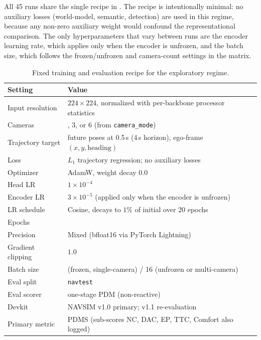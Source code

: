 All 45 runs share the single recipe in . The recipe is intentionally minimal: no auxiliary losses (world-model, semantic, detection) are used in this regime, because any non-zero auxiliary weight would confound the representational comparison. The only hyperparameters that vary between runs are the encoder learning rate, which applies only when the encoder is unfrozen, and the batch size, which follows the frozen/unfrozen and camera-count settings in the matrix.

\begin{table}[ht]
\centering
\caption{Fixed training and evaluation recipe for the exploratory regime.}
\label{tab:meth-lh-recipe}
\small
\renewcommand{\arraystretch}{1.15}
\setlength{\tabcolsep}{6pt}
\begin{tabular}{@{}>{\raggedright\arraybackslash}p{3.8cm} >{\raggedright\arraybackslash}p{8.5cm}@{}}
\toprule
\textbf{Setting} & \textbf{Value} \\
\midrule
Input resolution      & $224 \times 224$, normalized with per-backbone processor statistics \\
Cameras               & 1, 3, or 6 (from \texttt{camera\_mode}) \\
Trajectory target     & 8 future poses at 0.5\,s (4\,s horizon), ego-frame $(x, y, \text{heading})$ \\
Loss                  & $L_1$ trajectory regression; no auxiliary losses \\
Optimizer             & AdamW, weight decay $0.0$ \\
Head LR               & $1 \times 10^{-4}$ \\
Encoder LR            & $3 \times 10^{-5}$ (applied only when the encoder is unfrozen) \\
LR schedule           & Cosine, decays to $1\%$ of initial over 20 epochs \\
Epochs                & 20 \\
Precision             & Mixed (bfloat16 via PyTorch Lightning) \\
Gradient clipping     & $1.0$ \\
Batch size            & 32 (frozen, single-camera) / 16 (unfrozen or multi-camera) \\
Eval split            & \texttt{navtest} \\
Eval scorer           & one-stage PDM (non-reactive) \\
Devkit                & NAVSIM v1.0 primary; v1.1 re-evaluation \\
Primary metric        & PDMS (sub-scores NC, DAC, EP, TTC, Comfort also logged) \\
\bottomrule
\end{tabular}
\end{table}

